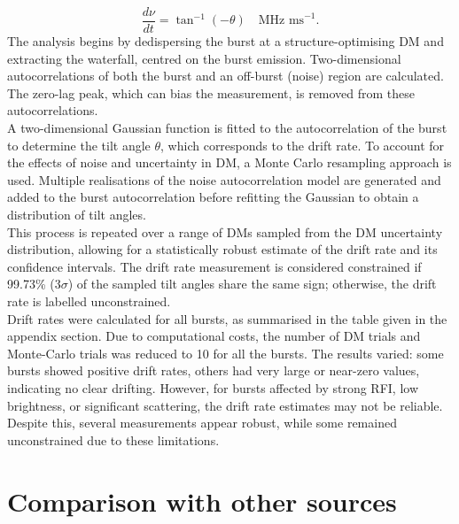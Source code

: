 \documentclass[preprint2, trackchanges]{aastex631}
\begin{document}
\[
\frac{d\nu}{dt} = \tan^{-1}(-\theta) \quad \text{MHz ms}^{-1}.
\]
The analysis begins by dedispersing the burst at a structure-optimising DM and extracting the waterfall, centred on the burst emission. Two-dimensional autocorrelations of both the burst and an off-burst (noise) region are calculated. The zero-lag peak, which can bias the measurement, is removed from these autocorrelations.
\\
A two-dimensional Gaussian function is fitted to the autocorrelation of the burst to determine the tilt angle $\theta$, which corresponds to the drift rate. To account for the effects of noise and uncertainty in DM, a Monte Carlo resampling approach is used. Multiple realisations of the noise autocorrelation model are generated and added to the burst autocorrelation before refitting the Gaussian to obtain a distribution of tilt angles.
\\
This process is repeated over a range of DMs sampled from the DM uncertainty distribution, allowing for a statistically robust estimate of the drift rate and its confidence intervals. The drift rate measurement is considered constrained if 99.73\% (3$\sigma$) of the sampled tilt angles share the same sign; otherwise, the drift rate is labelled unconstrained.
\\
Drift rates were calculated for all bursts, as summarised in the table given in the appendix section. Due to computational costs, the number of DM trials and Monte-Carlo trials was reduced to 10 for all the bursts. The results varied: some bursts showed positive drift rates, others had very large or near-zero values, indicating no clear drifting. However, for bursts affected by strong RFI, low brightness, or significant scattering, the drift rate estimates may not be reliable. Despite this, several measurements appear robust, while some remained unconstrained due to these limitations.



\section{Comparison with other sources}
\end{document}
